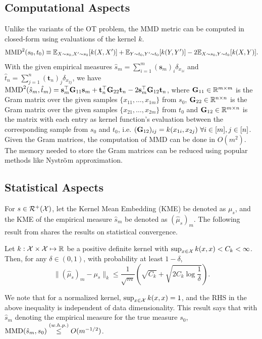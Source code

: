 \subsection{Computational Aspects}\label{bg:kernel-comp}
Unlike the variants of the OT problem, the MMD metric can be computed in closed-form using evaluations of the kernel $k$. $$\textup{MMD}^2(s_0, t_0) \equiv \mathbb{E}_{X\sim s_0, X'\sim s_0}[k(X, X')] + \mathbb{E}_{Y\sim t_0,Y'\sim t_0}[k(Y, Y')] -2\mathbb{E}_{X\sim s_0, Y\sim t_0}[k(X, Y)].$$
With the given empirical measures $\hat{s}_m=\sum_{i=1}^m(\mathbf{s}_m)_i\delta_{x_{1i}}$ and $\hat{t}_n=\sum_{j=1}^n(\mathbf{t}_n)_j\delta_{x_{2j}}$, we have
$\textup{MMD}^2(\hat{s}_m, \hat{t}_m) = \mathbf{s}_m^\top \mathbf{G}_{11}\mathbf{s}_m+\mathbf{t}_n^\top \mathbf{G}_{22}\mathbf{t}_n - 2\mathbf{s}_m^\top \mathbf{G}_{12}\mathbf{t}_n$, where $\mathbf{G}_{11}\in \mathbb{R}^{m\times m}$ is the Gram matrix over the given samples $\{x_{11}, \ldots, x_{1m}\}$ from $s_0$, $\mathbf{G}_{22}\in \mathbb{R}^{n\times n}$ is the Gram matrix over the given samples $\{x_{21}, \ldots, x_{2m}\}$ from $t_0$ and $\mathbf{G}_{12}\in \mathbb{R}^{m\times n}$ is the matrix with each entry as kernel function’s evaluation between the corresponding sample from $s_0$ and $t_0$, i.e. $(\bG_{12})_{ij} = k(x_{1i}, x_{2j})\ \forall i\in [m], j\in [n]$. Given the Gram matrices, the computation of MMD can be done in $O(m^2)$.
The memory needed to store the Gram matrices can be reduced using popular methods like Nystr$\ddot{\textup{o}}$m approximation.

\subsection{Statistical Aspects}\label{bg:kernel-stats}
For $s\in \mathcal{R}^+(\mathcal{X})$, let the Kernel Mean Embedding (KME) be denoted as $\mu_s$, and the KME of the empirical measure $\hat{s}_m$ be denoted as $(\hat{\mu}_s)_m$. The following result from \citet[Theorem (3.4)]{Muandet_2017} shares the results on statistical convergence.
\begin{theorem}
    Let $k:\mathcal{X}\times \mathcal{X}\mapsto \mathbb{R}$ be a positive definite kernel with $\sup_{x\in \mathcal{X}}k(x, x)<C_k<\infty$. Then, for any $\delta\in (0, 1)$, with probability at least $1-\delta$,
    $$\|(\hat{\mu}_s)_m- \mu_s\|_k\leq \frac{1}{\sqrt{m}}\left(\sqrt{C_k}+\sqrt{2C_k\log\frac{1}{\delta}} \right).$$
\end{theorem}
We note that for a normalized kernel, $\sup_{x\in \mathcal{X}}k(x, x)=1$, and the RHS in the above inequality is independent of data dimensionality.
This result says that with $\hat{s}_m$ denoting the empirical measure for the true measure $s_0$, $\textup{MMD}(\hat{s}_m, s_0) \stackrel{(w.h.p.)}{\leq} O(m^{-1/2})$.


